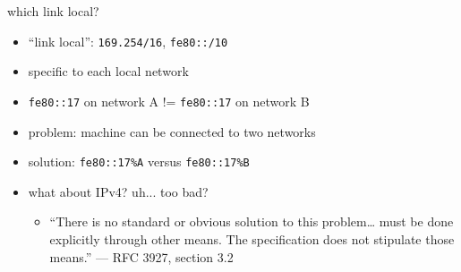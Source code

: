 \begin{frame}{which link local?}
    \begin{itemize}
    \item ``link local'': \texttt{169.254/16}, \texttt{fe80::/10}
    \item specific to each local network
    \vspace{.5cm}
    \item \texttt{fe80::17} on network A != \texttt{fe80::17} on network B
    \vspace{.5cm}
    \item problem: machine can be connected to two networks
    \item<2-> solution: \texttt{fe80::17\%A} versus \texttt{fe80::17\%B}
    \item<3-> what about IPv4? uh... too bad?
        \begin{itemize}
        \item ``There is no standard or obvious solution to this problem\ldots
        must be done explicitly through other means. The specification does not stipulate
        those means.'' --- RFC 3927, section 3.2
        \end{itemize}
    \end{itemize}
\end{frame}

